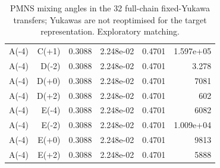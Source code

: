 \begin{table}[htbp]
\begin{tabular}{lrrrrr}
A(-4) & C(+1) & 0.3088 & 2.248e-02 & 0.4701 & 1.597e+05 \\
A(-4) & D(-2) & 0.3088 & 2.248e-02 & 0.4701 & 3.278 \\
A(-4) & D(+0) & 0.3088 & 2.248e-02 & 0.4701 & 7081 \\
A(-4) & D(+2) & 0.3088 & 2.248e-02 & 0.4701 & 602 \\
A(-4) & E(-4) & 0.3088 & 2.248e-02 & 0.4701 & 6082 \\
A(-4) & E(-2) & 0.3088 & 2.248e-02 & 0.4701 & 1.009e+04 \\
A(-4) & E(+0) & 0.3088 & 2.248e-02 & 0.4701 & 9813 \\
A(-4) & E(+2) & 0.3088 & 2.248e-02 & 0.4701 & 5888 \\
\hline
\end{tabular}
\caption{PMNS mixing angles in the 32 full-chain fixed-Yukawa transfers; Yukawas are not reoptimised for the target representation. Exploratory matching.}
\label{tab:generalised_b3}
\end{table}
